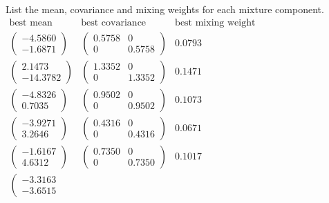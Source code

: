 \documentclass{article}
\begin{document}
\newpage
List the mean, covariance and mixing weights for each mixture component.
\begin{math}
\begin{aligned}
\mbox{best mean} & \mbox{best covariance} & \mbox{best mixing weight} \\
\left( \begin{array}{c}  -4.5860 \\ -1.6871
\end{array} \right) 
& \left( \begin{array}{cc}  0.5758  &  0 \\ 0    & 0.5758
\end{array} \right) 
&  0.0793   \\ %
\left( \begin{array}{c} 2.1473  \\  -14.3782
\end{array} \right)
& \left( \begin{array}{cc}  1.3352  & 0 \\ 0   & 1.3352
\end{array} \right) 
&  0.1471  \\ %
\left( \begin{array}{c}   -4.8326  \\  0.7035
\end{array} \right) 
& \left( \begin{array}{cc}   0.9502 & 0  \\ 0   &  0.9502
\end{array} \right) 
&  0.1073 \\ %
\left( \begin{array}{c}  -3.9271  \\  3.2646
\end{array} \right) 
& \left( \begin{array}{cc}   0.4316 & 0 \\  0  & 0.4316
\end{array} \right) 
&  0.0671   \\ %
\left( \begin{array}{c} -1.6167   \\  4.6312
\end{array} \right) 
& \left( \begin{array}{cc}   0.7350   & 0  \\  0  &  0.7350 
\end{array} \right) 
&  0.1017  \\ %
\left( \begin{array}{c}  -3.3163 \\  -3.6515

\end{array}
\end{aligned}
\end{math}
\end{document}
